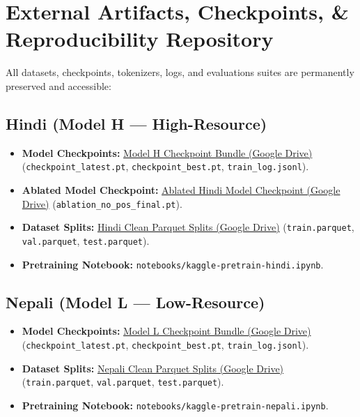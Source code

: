 \documentclass[10pt,a4paper]{article}
\begin{document}
\section{External Artifacts, Checkpoints, \& Reproducibility Repository}

All datasets, checkpoints, tokenizers, logs, and evaluations suites are permanently preserved and accessible:

\subsection{Hindi (Model H --- High-Resource)}
\begin{itemize}
    \item \textbf{Model Checkpoints:} \href{https://drive.google.com/file/d/1zqv-qrALlxFdNHmKJejUZZH0ZVjodgbr/view?usp=sharing}{Model H Checkpoint Bundle (Google Drive)} (\texttt{checkpoint\_latest.pt}, \texttt{checkpoint\_best.pt}, \texttt{train\_log.jsonl}).
    \item \textbf{Ablated Model Checkpoint:} \href{https://drive.google.com/file/d/19mjFnqzE9yLC6ML7U7srrU99zEbaB5Ug/view?usp=drive_link}{Ablated Hindi Model Checkpoint (Google Drive)} (\texttt{ablation\_no\_pos\_final.pt}).
    \item \textbf{Dataset Splits:} \href{https://drive.google.com/drive/folders/17mJ-Z-ZV0Z4JJwsiUeF_vFyrdrOFH_j0?usp=drive_link}{Hindi Clean Parquet Splits (Google Drive)} (\texttt{train.parquet}, \texttt{val.parquet}, \texttt{test.parquet}).
    \item \textbf{Pretraining Notebook:} \texttt{notebooks/kaggle-pretrain-hindi.ipynb}.
\end{itemize}

\subsection{Nepali (Model L --- Low-Resource)}
\begin{itemize}
    \item \textbf{Model Checkpoints:} \href{https://drive.google.com/file/d/1ocqIcYfPMbqKulJKXM90mGxmSBglzlmU/view?usp=sharing}{Model L Checkpoint Bundle (Google Drive)} (\texttt{checkpoint\_latest.pt}, \texttt{checkpoint\_best.pt}, \texttt{train\_log.jsonl}).
    \item \textbf{Dataset Splits:} \href{https://drive.google.com/drive/folders/1RpUp7q1akokeMXfAdlaxQTO-MHqfoxX4?usp=drive_link}{Nepali Clean Parquet Splits (Google Drive)} (\texttt{train.parquet}, \texttt{val.parquet}, \texttt{test.parquet}).
    \item \textbf{Pretraining Notebook:} \texttt{notebooks/kaggle-pretrain-nepali.ipynb}.
\end{itemize}
\end{document}
